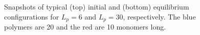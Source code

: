 \begin{figure}
	\begin{center}

	\end{center}
	\caption[Snapshots of initial and equilibrium configurations for $L_p = 6$ and $L_p = 30$]{Snapshots of typical (top) initial and (bottom) equilibrium configurations for $L_p = 6$ and $L_p = 30$, respectively.  The blue polymers are 20 and the red are 10 monomers long.}\label{snap}
\end{figure}

